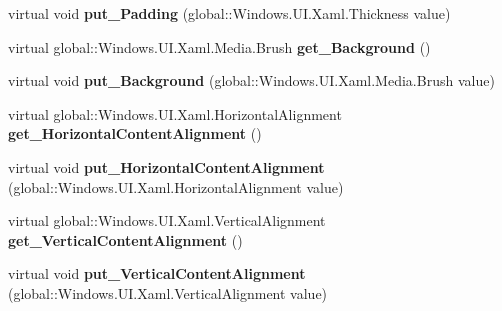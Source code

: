 \begin{DoxyCompactItemize}
virtual void {\bfseries put\+\_\+\+Padding} (global\+::\+Windows.\+U\+I.\+Xaml.\+Thickness value)
\item 
\mbox{\label{class_windows_1_1_u_i_1_1_xaml_1_1_controls_1_1_content_presenter_a9973a77cdfc92b18a4a687327e9c149b}} 
virtual global\+::\+Windows.\+U\+I.\+Xaml.\+Media.\+Brush {\bfseries get\+\_\+\+Background} ()
\item 
\mbox{\label{class_windows_1_1_u_i_1_1_xaml_1_1_controls_1_1_content_presenter_ae714d41e5603173b44adc7fa70273933}} 
virtual void {\bfseries put\+\_\+\+Background} (global\+::\+Windows.\+U\+I.\+Xaml.\+Media.\+Brush value)
\item 
\mbox{\label{class_windows_1_1_u_i_1_1_xaml_1_1_controls_1_1_content_presenter_a7b8ae8a80577e1c215603bbc8edd87ac}} 
virtual global\+::\+Windows.\+U\+I.\+Xaml.\+Horizontal\+Alignment {\bfseries get\+\_\+\+Horizontal\+Content\+Alignment} ()
\item 
\mbox{\label{class_windows_1_1_u_i_1_1_xaml_1_1_controls_1_1_content_presenter_a6e040f832bb892f6df011c71adb2c9b7}} 
virtual void {\bfseries put\+\_\+\+Horizontal\+Content\+Alignment} (global\+::\+Windows.\+U\+I.\+Xaml.\+Horizontal\+Alignment value)
\item 
\mbox{\label{class_windows_1_1_u_i_1_1_xaml_1_1_controls_1_1_content_presenter_a3b6496fc4d34dd5a35e2a4e77e0b0884}} 
virtual global\+::\+Windows.\+U\+I.\+Xaml.\+Vertical\+Alignment {\bfseries get\+\_\+\+Vertical\+Content\+Alignment} ()
\item 
\mbox{\label{class_windows_1_1_u_i_1_1_xaml_1_1_controls_1_1_content_presenter_a9bb6e0ddface2525bafcaff338c4573d}} 
virtual void {\bfseries put\+\_\+\+Vertical\+Content\+Alignment} (global\+::\+Windows.\+U\+I.\+Xaml.\+Vertical\+Alignment value)
\item 
\mbox{\label{class_windows_1_1_u_i_1_1_xaml_1_1_controls_1_1_content_presenter_a1bd0d8cbe62a3644e7315fa42ab2795f}} 

\end{DoxyCompactItemize}
